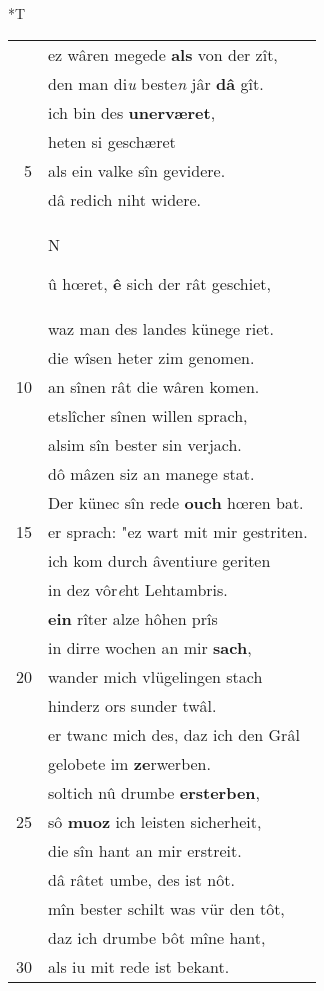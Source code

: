 \documentclass[8pt,a4paper,notitlepage]{article}
\begin{document}
\begin{table}[ht]
\begin{minipage}[t]{0.5\linewidth}
\small
\begin{center}*T
\end{center}
\begin{tabular}{rl}
 & ez wâren megede \textbf{als} von der zît,\\ 
 & den man di\textit{u} beste\textit{n} jâr \textbf{dâ} gît.\\ 
 & ich bin des \textbf{unerværet},\\ 
 & heten si geschæret\\ 
5 & als ein valke sîn gevidere.\\ 
 & dâ redich niht widere.\\ 
 & \begin{large}N\end{large}û hœret, \textbf{ê} sich der rât geschiet,\\ 
 & waz man des landes künege riet.\\ 
 & die wîsen heter zim genomen.\\ 
10 & an sînen rât die wâren komen.\\ 
 & etslîcher sînen willen sprach,\\ 
 & alsim sîn bester sin verjach.\\ 
 & dô mâzen siz an manege stat.\\ 
 & Der künec sîn rede \textbf{ouch} hœren bat.\\ 
15 & er sprach: "ez wart mit mir gestriten.\\ 
 & ich kom durch âventiure geriten\\ 
 & in dez vôr\textit{e}ht Lehtambris.\\ 
 & \textbf{ein} rîter alze hôhen prîs\\ 
 & in dirre wochen an mir \textbf{sach},\\ 
20 & wander mich vlügelingen stach\\ 
 & hinderz ors sunder twâl.\\ 
 & er twanc mich des, daz ich den Grâl\\ 
 & gelobete im \textbf{ze}rwerben.\\ 
 & soltich nû drumbe \textbf{ersterben},\\ 
25 & sô \textbf{muoz} ich leisten sicherheit,\\ 
 & die sîn hant an mir erstreit.\\ 
 & dâ râtet umbe, des ist nôt.\\ 
 & mîn bester schilt was vür den tôt,\\ 
 & daz ich drumbe bôt mîne hant,\\ 
30 & als iu mit rede ist bekant.\\ 

\end{tabular}
\end{minipage}
\end{table}
\end{document}
